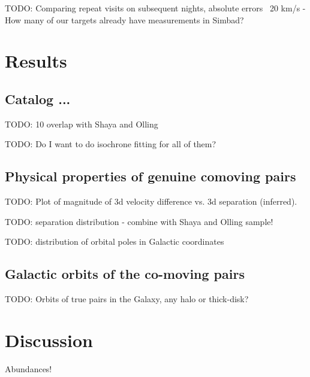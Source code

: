 \documentclass[modern, letterpaper]{aastex61}
\begin{document}
TODO: Comparing repeat visits on subsequent nights, absolute errors ~20 km/s
- How many of our targets already have measurements in Simbad?



\section{Results}

\subsection{Catalog ...}\label{sec:}

TODO: 10 overlap with Shaya and Olling

TODO: Do I want to do isochrone fitting for all of them?

\subsection{Physical properties of genuine comoving pairs}\label{sec:}

TODO: Plot of magnitude of 3d velocity difference vs. 3d separation (inferred).

TODO: separation distribution - combine with Shaya and Olling sample!

TODO: distribution of orbital poles in Galactic coordinates

\subsection{Galactic orbits of the co-moving pairs}\label{sec:}

TODO: Orbits of true pairs in the Galaxy, any halo or thick-disk?

\section{Discussion}

Abundances!
\end{document}
